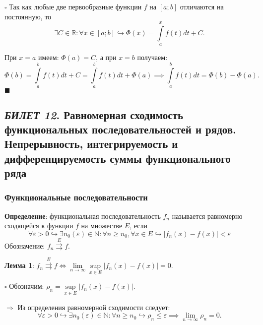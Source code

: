 \documentclass[12pt, a4paper, reqno]{article}
\begin{document}
    $\square$
    Так как любые две первообразные функции $f$ на $[a; b]$ отличаются на постоянную, то
    \begin{equation*}
        \exists C \in \mathbb{R}: \forall x \in [a; b] \hookrightarrow
        \Phi(x) = \int\limits_{a}^{x} f(t)dt + C.
    \end{equation*}

    При $x = a$ имеем: $\Phi(a) = C$, а при $x = b$ получаем:
    \begin{equation*}
        \Phi(b) = \int\limits_{a}^{b} f(t)dt + C = \int\limits_{a}^{b} f(t)dt + \Phi(a) \implies
        \int\limits_{a}^{b} f(t)dt = \Phi(b) - \Phi(a).
    \end{equation*}
    $\blacksquare$

\newpage
\subsection{\textit{БИЛЕТ 12}. Равномерная сходимость функциональных последовательностей и рядов.
            Непрерывность, интегрируемость и дифференцируемость суммы функционального ряда}

    \subsubsection{Функциональные последовательности}

    \textbf{Определение}: функциональная последовательность $f_n$ называется равномерно сходящейся
    к функции $f$ на множестве $E$, если
    \begin{equation*}
        \forall \varepsilon > 0 \hookrightarrow \exists n_0(\varepsilon) \in \mathbb{N}: \forall n \geq n_0,
        \forall x \in E \hookrightarrow |f_n(x) - f(x)| < \varepsilon
    \end{equation*}
    Обозначение: $f_n \overset{E}{\rightrightarrows} f$.

    \textbf{Лемма 1}: $f_n \overset{E}{\rightrightarrows} f \iff
    \lim\limits_{n \to \infty} \sup\limits_{x \in E} |f_n(x) - f(x)| = 0$.

    $\square$
    Обозначим: $\rho_n = \sup\limits_{x \in E} |f_n(x) - f(x)|$.

    $\boxed{\Rightarrow}$ Из определения равномерной сходимости следует:
    \begin{equation*}
        \forall \varepsilon > 0 \hookrightarrow \exists n_0(\varepsilon) \in \mathbb{N}: \forall n \geq n_0
        \hookrightarrow \rho_n \leq \varepsilon \implies \lim\limits_{n \to \infty} \rho_n = 0.
    \end{equation*}
\end{document}
